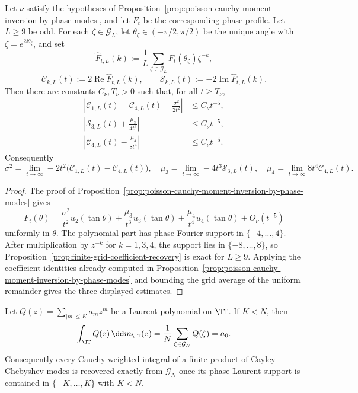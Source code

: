 \begin{theorem}%
\label{thm:finite-grid-poisson-moment-recovery}
Let \(\nu\) satisfy the hypotheses of
Proposition~\ref{prop:poisson-cauchy-moment-inversion-by-phase-modes}, and
let \(F_t\) be the corresponding phase profile.  Let \(L\ge9\) be odd.  For
each \(\zeta\in\mathcal G_L\), let
\(\theta_\zeta\in(-\pi/2,\pi/2)\) be the unique angle with
\(\zeta=e^{2\ii\theta_\zeta}\), and set
\[
\widehat F_{t,L}(k):=\frac1L\sum_{\zeta\in\mathcal G_L}
F_t(\theta_\zeta)\zeta^{-k},
\]
\[
\mathcal C_{k,L}(t):=2\operatorname{Re}\widehat F_{t,L}(k),
\qquad
\mathcal S_{k,L}(t):=-2\operatorname{Im}\widehat F_{t,L}(k).
\]
Then there are constants \(C_\nu,T_\nu>0\) such that, for all
\(t\ge T_\nu\),
\begin{align}
\left|
\mathcal C_{1,L}(t)-\mathcal C_{4,L}(t)
+\frac{\sigma^2}{2t^2}
\right|
&\le C_{\nu}t^{-5},\label{eq:finite-grid-sigma-recovery}\\
\left|
\mathcal S_{3,L}(t)+\frac{\mu_3}{4t^3}
\right|
&\le C_{\nu}t^{-5},\label{eq:finite-grid-mu-three-recovery}\\
\left|
\mathcal C_{4,L}(t)-\frac{\mu_4}{8t^4}
\right|
&\le C_{\nu}t^{-5}.\label{eq:finite-grid-mu-four-recovery}
\end{align}
Consequently
\[
\sigma^2=\lim_{t\to\infty}
-2t^2\bigl(\mathcal C_{1,L}(t)-\mathcal C_{4,L}(t)\bigr),
\quad
\mu_3=\lim_{t\to\infty}-4t^3\mathcal S_{3,L}(t),
\quad
\mu_4=\lim_{t\to\infty}8t^4\mathcal C_{4,L}(t).
\]
\end{theorem}

\begin{proof}
The proof of
Proposition~\ref{prop:poisson-cauchy-moment-inversion-by-phase-modes} gives
\[
F_t(\theta)=
\frac{\sigma^2}{t^2}u_2(\tan\theta)
+\frac{\mu_3}{t^3}u_3(\tan\theta)
+\frac{\mu_4}{t^4}u_4(\tan\theta)+O_\nu(t^{-5})
\]
uniformly in \(\theta\).  The polynomial part has phase Fourier support in
\(\{-4,\ldots,4\}\).  After multiplication by \(z^{-k}\) for
\(k=1,3,4\), the support lies in \(\{-8,\ldots,8\}\), so
Proposition~\ref{prop:finite-grid-coefficient-recovery} is exact for
\(L\ge9\).  Applying the coefficient identities already computed in
Proposition~\ref{prop:poisson-cauchy-moment-inversion-by-phase-modes} and
bounding the grid average of the uniform remainder gives the three displayed
estimates.
\end{proof}

\begin{corollary}%
\label{cor:alias-free-cayley-mode-product-quadrature}
Let \(Q(z)=\sum_{|m|\le K}a_mz^m\) be a Laurent polynomial on \(\TT\).  If
\(K<N\), then
\[
\int_{\TT}Q(z)\,\dd m_{\TT}(z)
=\frac1N\sum_{\zeta\in\mathcal G_N}Q(\zeta)=a_0.
\]
Consequently every Cauchy-weighted integral of a finite product of
Cayley--Chebyshev modes is recovered exactly from \(\mathcal G_N\) once its
phase Laurent support is contained in \(\{-K,\ldots,K\}\) with \(K<N\).
\end{corollary}

